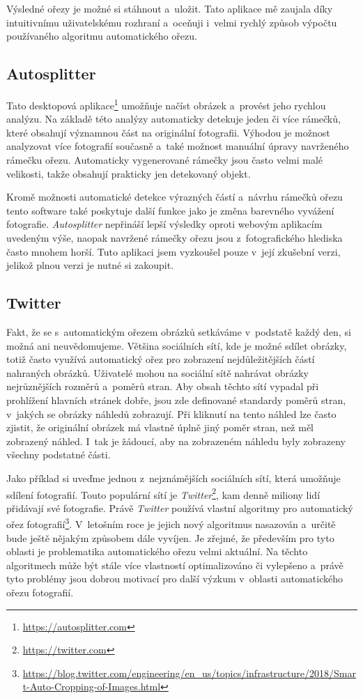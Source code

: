 Výsledné ořezy je možné si stáhnout a~uložit. Tato aplikace mě zaujala díky intuitivnímu uživatelskému rozhraní a~oceňuji i~velmi rychlý způsob výpočtu používaného algoritmu automatického ořezu.

\subsection{Autosplitter}
Tato desktopová aplikace\footnote{\url{https://autosplitter.com}} umožňuje načíst obrázek a~provést jeho rychlou analýzu. Na základě této analýzy automaticky detekuje jeden či více rámečků, které obsahují významnou část na originální fotografii. Výhodou je možnost analyzovat více fotografií současně a~také možnost manuální úpravy navrženého rámečku ořezu. Automaticky vygenerované rámečky jsou často velmi malé velikosti, takže obsahují prakticky jen detekovaný objekt.

Kromě možnosti automatické detekce výrazných částí a~návrhu rámečků ořezu tento software také poskytuje další funkce jako je změna barevného vyvážení fotografie. \emph{Autosplitter} nepřináší lepší výsledky oproti webovým aplikacím uvedeným výše, naopak navržené rámečky ořezu jsou z~fotografického hlediska často mnohem horší. Tuto aplikaci jsem vyzkoušel pouze v~její zkušební verzi, jelikož plnou verzi je nutné si zakoupit.

\subsection{Twitter}
Fakt, že se s~automatickým ořezem obrázků setkáváme v~podstatě každý den, si možná ani neuvědomujeme. Většina sociálních sítí, kde je možné sdílet obrázky, totiž často využívá automatický ořez pro zobrazení nejdůležitějších částí nahraných obrázků. Uživatelé mohou na sociální sítě nahrávat obrázky nejrůznějších rozměrů a~poměrů stran. Aby obsah těchto sítí vypadal při prohlížení hlavních stránek dobře, jsou zde definované standardy poměrů stran, v~jakých se obrázky náhledů zobrazují. Při kliknutí na tento náhled lze často zjistit, že originální obrázek má vlastně úplně jiný poměr stran, než měl zobrazený náhled. I~tak je žádoucí, aby na zobrazeném náhledu byly zobrazeny všechny podstatné části.

Jako příklad si uveďme jednou z~nejznámějších sociálních sítí, která umožňuje sdílení fotografií. Touto populární sítí je \emph{Twitter}\footnote{\url{https://twitter.com}}, kam denně miliony lidí přidávají své fotografie. Právě \emph{Twitter} používá vlastní algoritmy pro automatický ořez fotografií\footnote{\url{https://blog.twitter.com/engineering/en_us/topics/infrastructure/2018/Smart-Auto-Cropping-of-Images.html}}. V~letošním roce je jejich nový algoritmus nasazován a~určitě bude ještě nějakým způsobem dále vyvíjen. Je zřejmé, že především pro tyto oblasti je problematika automatického ořezu velmi aktuální. Na těchto algoritmech může být stále více vlastností optimalizováno či vylepšeno a~právě tyto problémy jsou dobrou motivací pro další výzkum v~oblasti automatického ořezu fotografií.

